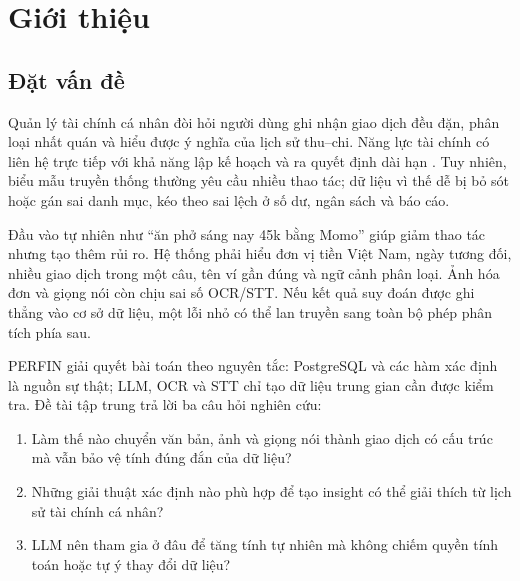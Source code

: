 \chapter{Giới thiệu}
\label{chap:introduction}

\section{Đặt vấn đề}

Quản lý tài chính cá nhân đòi hỏi người dùng ghi nhận giao dịch đều đặn, phân loại nhất quán và hiểu được ý nghĩa của lịch sử thu--chi. Năng lực tài chính có liên hệ trực tiếp với khả năng lập kế hoạch và ra quyết định dài hạn \cite{lusardi2014}. Tuy nhiên, biểu mẫu truyền thống thường yêu cầu nhiều thao tác; dữ liệu vì thế dễ bị bỏ sót hoặc gán sai danh mục, kéo theo sai lệch ở số dư, ngân sách và báo cáo.

Đầu vào tự nhiên như ``ăn phở sáng nay 45k bằng Momo'' giúp giảm thao tác nhưng tạo thêm rủi ro. Hệ thống phải hiểu đơn vị tiền Việt Nam, ngày tương đối, nhiều giao dịch trong một câu, tên ví gần đúng và ngữ cảnh phân loại. Ảnh hóa đơn và giọng nói còn chịu sai số OCR/STT. Nếu kết quả suy đoán được ghi thẳng vào cơ sở dữ liệu, một lỗi nhỏ có thể lan truyền sang toàn bộ phép phân tích phía sau.

PERFIN giải quyết bài toán theo nguyên tắc: PostgreSQL và các hàm xác định là nguồn sự thật; LLM, OCR và STT chỉ tạo dữ liệu trung gian cần được kiểm tra. Đề tài tập trung trả lời ba câu hỏi nghiên cứu:

\begin{enumerate}
  \item Làm thế nào chuyển văn bản, ảnh và giọng nói thành giao dịch có cấu trúc mà vẫn bảo vệ tính đúng đắn của dữ liệu?
  \item Những giải thuật xác định nào phù hợp để tạo insight có thể giải thích từ lịch sử tài chính cá nhân?
  \item LLM nên tham gia ở đâu để tăng tính tự nhiên mà không chiếm quyền tính toán hoặc tự ý thay đổi dữ liệu?
\end{enumerate}


